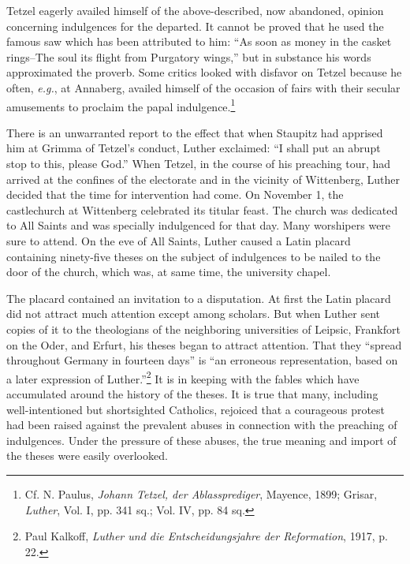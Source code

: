 Tetzel eagerly availed himself of the above-described, now abandoned,
opinion concerning indulgences for the departed. It cannot
be proved that he used the famous saw which has been attributed
to him: “As soon as money in the casket rings--The soul its flight
from Purgatory wings,” but in substance his words approximated
the proverb. Some critics looked with disfavor on Tetzel because
he often, \textit{e.g.}, at Annaberg, availed himself of the occasion of fairs
with their secular amusements to proclaim the papal indulgence.\footnote
{Cf. N. Paulus, \textit{Johann Tetzel, der Ablassprediger}, Mayence, 1899; Grisar, \textit{Luther}, Vol.
I, pp. 341 sq.; Vol. IV, pp. 84 sq.}

There is an unwarranted report to the effect that when Staupitz
had apprised him at Grimma of Tetzel’s conduct, Luther exclaimed:
“I shall put an abrupt stop to this, please God.” When Tetzel, in
the course of his preaching tour, had arrived at the confines of the
electorate and in the vicinity of Wittenberg, Luther decided that
the time for intervention had come. On November 1, the castlechurch
at Wittenberg celebrated its titular feast. The church was
dedicated to All Saints and was specially indulgenced for that day.
Many worshipers were sure to attend. On the eve of All Saints, Luther
caused a Latin placard containing ninety-five theses on the subject of
indulgences to be nailed to the door of the church, which was, at
same time, the university chapel.

The placard contained an invitation to a disputation. At first the
Latin placard did not attract much attention except among scholars.
But when Luther sent copies of it to the theologians of the neighboring
universities of Leipsic, Frankfort on the Oder, and Erfurt,
his theses began to attract attention. That they “spread throughout
Germany in fourteen days” is “an erroneous representation, based
on a later expression of Luther.”\footnote
{Paul Kalkoff, \textit{Luther und die Entscheidungsjahre der Reformation}, 1917, p. 22.}
It is in keeping with the fables
which have accumulated around the history of the theses. It is true
that many, including well-intentioned but shortsighted Catholics,
rejoiced that a courageous protest had been raised against the prevalent
abuses in connection with the preaching of indulgences. Under
the pressure of these abuses, the true meaning and import of the
theses were easily overlooked.

